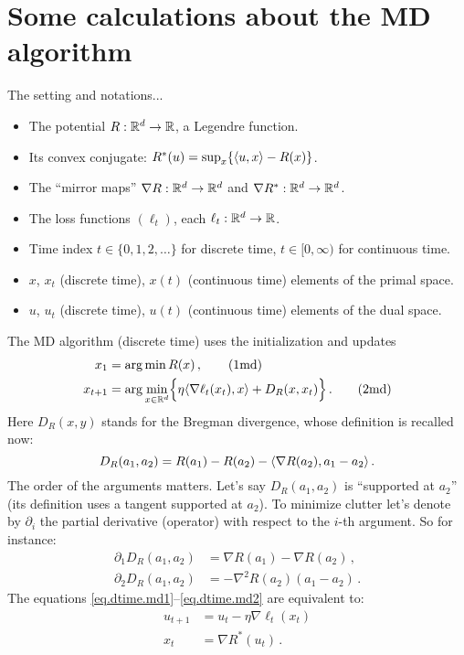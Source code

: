 \documentclass[12pt]{article}
\theoremstyle{plain}
\theoremstyle{definition}
\theoremstyle{remark}
\begin{document}

\section*{Some calculations about the MD algorithm}

\noindent
The setting and notations...
\begin{itemize}[leftmargin=*, itemsep=2pt]
\item The potential $R : \mathbb{R}^d \to \mathbb{R}$, a Legendre function.
\item Its convex conjugate: $R^{*}(u) = \sup_{x} \{ \langle {u,x}\rangle - R(x)\}$.
\item The ``mirror maps'' $\nabla R : \mathbb{R}^d \to \mathbb{R}^d$ and $\nabla R^{*} : \mathbb{R}^d \to \mathbb{R}^d$.
\item The loss functions $(\ell_t)$, each $\ell_t : \mathbb{R}^d \to \mathbb{R}$.
\item Time index $t \in \{ 0,1,2,\ldots \}$ for discrete time, $t \in [0,\infty)$ for continuous time.
\item $x$, $x_t$ (discrete time), $x(t)$ (continuous time) elements of the primal space.
\item $u$, $u_t$ (discrete time), $u(t)$ (continuous time) elements of the dual space.
\end{itemize}
The MD algorithm (discrete time) uses the initialization and updates
\begin{align}
x_1 &= \arg\min R(x)\,, \label{eq.dtime.md1} \tag{1md} \\
x_{t+1} &= \arg\min_{x \in \mathbb{R}^d} \Bigl\{ \eta \langle {\nabla\ell_t(x_{t}), x}\rangle + D_{R}(x, x_{t})\Bigr\}\,.
 \label{eq.dtime.md2} 
\tag{2md}
\end{align}
Here $D_{R}(x,y)$ stands for the Bregman divergence, whose definition is recalled now:
\[
D_{R}(a_{1}, a_{2}) = R(a_{1}) - R(a_{2}) - \langle {\nabla R(a_2), a_{1} - a_{2}}\rangle\,.
\]
The order of the arguments matters.
Let's say $D_{R}(a_{1},a_{2})$ is ``supported at $a_{2}$''
(its definition uses a tangent supported at $a_{2}$).
To minimize clutter let's denote by $\partial_{i}$ the partial derivative (operator)
with respect to the $i$-th argument. So for instance:
\begin{align*}
\partial_{1} D_{R}(a_{1}, a_{2}) &= \nabla R(a_{1}) - \nabla R(a_{2})\,, \\[1mm]
\partial_{2} D_{R}(a_{1}, a_{2}) &= - \nabla^2 R(a_{2})(a_{1} - a_{2})\,.
\end{align*}
The equations \eqref{eq.dtime.md1}--\eqref{eq.dtime.md2} are equivalent to:
\begin{align*}
u_{t+1} &= u_{t} - \eta \nabla \ell_{t}(x_{t}) \label{eq.dtime.1} \tag{1dt} \\
x_{t} &= \nabla R^{*}(u_{t})\,. \label{eq.dtime.2} \tag{2dt}
\end{align*}
\end{document}
